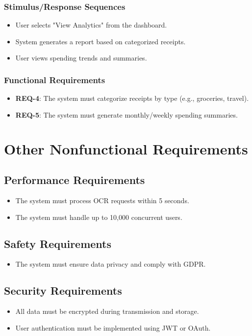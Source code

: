 \documentclass[12pt]{article}
\begin{document}
\subsubsection{Stimulus/Response Sequences}
\begin{itemize}
    \item User selects "View Analytics" from the dashboard.
    \item System generates a report based on categorized receipts.
    \item User views spending trends and summaries.
\end{itemize}

\subsubsection{Functional Requirements}
\begin{itemize}
    \item \textbf{REQ-4}: The system must categorize receipts by type (e.g., groceries, travel).
    \item \textbf{REQ-5}: The system must generate monthly/weekly spending summaries.
\end{itemize}

\section{Other Nonfunctional Requirements}
\subsection{Performance Requirements}
\begin{itemize}
    \item The system must process OCR requests within 5 seconds.
    \item The system must handle up to 10,000 concurrent users.
\end{itemize}

\subsection{Safety Requirements}
\begin{itemize}
    \item The system must ensure data privacy and comply with GDPR.
\end{itemize}

\subsection{Security Requirements}
\begin{itemize}
    \item All data must be encrypted during transmission and storage.
    \item User authentication must be implemented using JWT or OAuth.
\end{itemize}
\end{document}
